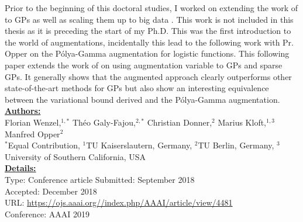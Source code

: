 


\graphicspath{{3/figures/}}

Prior to the beginning of this doctoral studies, I worked on extending the work of \citet{henaoBayesianNonlinearSupport2014} to \ac{GPs} as well as scaling them up to big data \cite{wenzel2017bayesian}.
This work is not included in this thesis as it is preceding the start of my Ph.D.
This was the first introduction to the world of augmentations, incidentally this lead to the following work with Pr. Opper on the P\'olya-Gamma augmentation for logistic functions.
This following paper extends the work of \citet{polsonBayesianInferenceLogistic2012} on using augmentation variable to \ac{GPs} and sparse \ac{GPs}.
It generally shows that the augmented approach clearly outperforms other state-of-the-art methods for \ac{GPs} but also show an interesting equivalence between the variational bound derived \citet{jaakkolaBayesianParameterEstimation2000} and the P\'olya-Gamma augmentation.\\

\textbf{\underline{Authors:}}\\
Florian Wenzel,$^{1,*}$ Th\'eo Galy-Fajou,$^{2,*}$ Christian Donner,$^{2}$ Marius Kloft,$^{1,3}$ Manfred Opper$^2$\\
\small{$^*$Equal Contribution, $^1$TU Kaiserslautern, Germany, $^2$TU Berlin, Germany, $^3$University of Southern California, USA}\\

\textbf{\underline{Details:}}\\
Type: Conference article
Submitted: September 2018\\
Accepted: December 2018\\
URL: \url{https://ojs.aaai.org//index.php/AAAI/article/view/4481}\\
Conference: AAAI 2019\\

